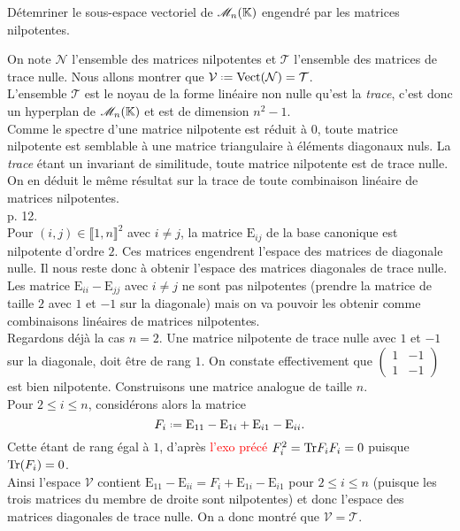 \begin{exercice}
    Détemriner le sous-espace vectoriel de $\mathscr{M}_n(\mathbb{K})$ engendré par les matrices nilpotentes.
\end{exercice}

\begin{solution}
    On note $\mathcal{N}$ l'ensemble des matrices nilpotentes et $\mathcal{T}$ l'ensemble des matrices de trace nulle. Nous allons montrer que $\mathcal{V} \defeq \Vect(\mathcal{N}) = \mathcal{T}$. \\
    L'ensemble $\mathcal{T}$ est le noyau de la forme linéaire non nulle qu'est la \emph{trace}, c'est donc un hyperplan de $\mathscr{M}_n(\mathbb{K})$ et est de dimension $n^2-1$. \\
    Comme le spectre d'une matrice nilpotente est réduit à $0$, toute matrice nilpotente est semblable à une matrice triangulaire à éléments diagonaux nuls. La \emph{trace} étant un invariant de similitude, toute matrice nilpotente est de trace nulle. On en déduit le même résultat sur la trace de toute combinaison linéaire de matrices nilpotentes. \\
    \cite{oraux_x_ens_2} p. 12. \\
    Pour $(i,j) \in \llbracket 1, n \rrbracket^2$ avec $i \not= j$, la matrice $\mathrm{E}_{ij}$ de la base canonique est nilpotente d'ordre $2$. Ces matrices engendrent l'espace des matrices de diagonale nulle. Il nous reste donc à obtenir l'espace des matrices diagonales de trace nulle. Les matrice $\mathrm{E}_{ii} - \mathrm{E}_{jj}$ avec $i \not= j$ ne sont pas nilpotentes (prendre la matrice de taille $2$ avec $1$ et $-1$ sur la diagonale) mais on va pouvoir les obtenir comme combinaisons linéaires de matrices nilpotentes. \\
    Regardons déjà la cas $n = 2$. Une matrice nilpotente de trace nulle avec $1$ et $-1$ sur la diagonale, doit être de rang $1$. On constate effectivement que $\begin{pmatrix} 1 & -1 \\ 1 & -1 \end{pmatrix}$ est bien nilpotente. Construisons une matrice analogue de taille $n$. \\
    Pour $2 \leqslant i \leqslant n$, considérons alors la matrice
    $$F_i \defeq \mathrm{E}_{11} - \mathrm{E}_{1i} + \mathrm{E}_{i1} - \mathrm{E}_{ii}.$$
    Cette étant de rang égal à $1$, d'après \textcolor{red}{l'exo précé} $F_i^2 = \mathrm{Tr}{F_i} F_i = 0$ puisque $\mathrm{Tr}(F_i) = 0$. \\
    Ainsi l'espace $\mathcal{V}$ contient $\mathrm{E}_{11}-\mathrm{E}_{ii} = F_i + \mathrm{E}_{1i} - \mathrm{E}_{i1}$ pour $2 \leqslant i \leqslant n$ (puisque les trois matrices du membre de droite sont nilpotentes) et donc l'espace des matrices diagonales de trace nulle. On a donc montré que $\mathcal{V} = \mathcal{T}$.
\end{solution}